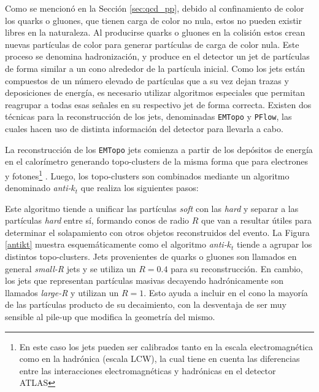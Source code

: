 Como se mencionó en la Sección \ref{sec:qcd_pp}, debido al confinamiento de color los quarks o gluones, que tienen carga de color no nula, estos no pueden existir libres en la naturaleza. Al producirse quarks o gluones en la colisión estos crean nuevas partículas de color para generar partículas de carga de color nula. Este proceso se denomina hadronización, y produce en el detector un jet de partículas de forma similar a un cono alrededor de la partícula inicial. Como los jets están compuestos de un número elevado de partículas que a su vez dejan trazas y deposiciones de energía, es necesario utilizar algoritmos especiales que permitan reagrupar a todas esas señales en su respectivo jet de forma correcta. Existen dos técnicas para la reconstrucción de los jets, denominadas \texttt{EMTopo} y \texttt{PFlow}, las cuales hacen uso de distinta información del detector para llevarla a cabo. 

La reconstrucción de los \texttt{EMTopo} jets comienza a partir de los depósitos de energía en el calorímetro generando topo-clusters de la misma forma que para electrones y fotones\footnote{En este caso los jets pueden ser calibrados tanto en la escala electromagnética como en la hadrónica (escala LCW), la cual tiene en cuenta las diferencias entre las interacciones electromagnéticas y hadrónicas en el detector ATLAS} \cite{Lampl:1099735}. Luego, los topo-clusters son combinados mediante un algoritmo denominado \textit{anti-$k_t$} \cite{Cacciari:2008gp} que realiza los siguientes pasos:



Este algoritmo tiende a unificar las partículas \textit{soft} con las \textit{hard} y separar a las partículas \textit{hard} entre sí, formando conos de radio $R$ que van a resultar útiles para determinar el solapamiento con otros objetos reconstruidos del evento. La Figura \ref{antikt} muestra esquemáticamente como el algoritmo \textit{anti-$k_t$} tiende a agrupar los distintos topo-clusters. Jets provenientes de quarks o gluones son llamados en general \textit{small-R} jets y se utiliza un $R=0.4$ para su reconstrucción. En cambio, los jets que representan partículas masivas decayendo hadrónicamente son llamados \textit{large-R} y utilizan un $R=1$. Esto ayuda a incluir en el cono la mayoría de las partículas producto de su decaimiento, con la desventaja de ser muy sensible al pile-up que modifica la geometría del mismo.



